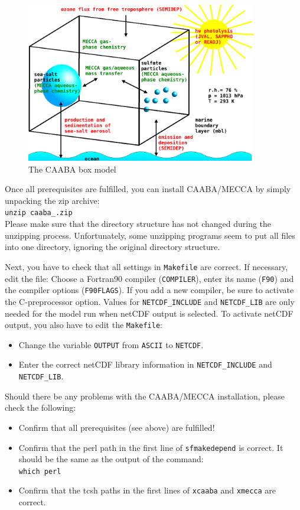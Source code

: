\documentclass[twoside]{article}
\def\nosep{\setlength\parsep{0mm}\setlength\topsep{0mm}\setlength\itemsep{0mm}}
\begin{document}
\begin{figure}[htb]
  \begin{center}
  \includegraphics[width=0.9\textwidth]{caaba_sketch}
  \end{center}
  \caption{The CAABA box model}
  \label{fig:caaba_sketch}
\end{figure}

Once all prerequisites are fulfilled, you can install CAABA/MECCA by
simply unpacking the zip archive:\\[2mm]
{\tt unzip caaba\_\meccaversion.zip}\\[2mm]
Please make sure that the directory structure has not changed during the
unzipping process. Unfortunately, some unzipping programs seem to put
all files into one directory, ignoring the original directory structure.

Next, you have to check that all settings in \verb|Makefile| are
correct. If necessary, edit the file: Choose a Fortran90 compiler
(\verb|COMPILER|), enter its name (\verb|F90|) and the compiler options
(\verb|F90FLAGS|). If you add a new compiler, be sure to activate the
C-preprocessor option. Values for \verb|NETCDF_INCLUDE| and
\verb|NETCDF_LIB| are only needed for the model run when netCDF output
is selected. To activate netCDF output, you also have to edit the
\verb|Makefile|:
\begin{itemize}\nosep
\item Change the variable \verb|OUTPUT| from \verb|ASCII| to
  \verb|NETCDF|.
\item Enter the correct netCDF library information in
  \verb|NETCDF_INCLUDE| and \verb|NETCDF_LIB|.
\end{itemize}

Should there be any problems with the CAABA/MECCA installation, please
check the following:
\begin{itemize}\nosep
\item Confirm that all prerequisites (see above) are fulfilled!
\item Confirm that the perl path in the first line of
  \verb|sfmakedepend| is correct. It should be the same as the output of
  the command:\\
  \verb|which perl|
\item Confirm that the tcsh paths in the first lines of
  \verb|xcaaba| and \verb|xmecca| are correct.
\end{itemize}
\end{document}
